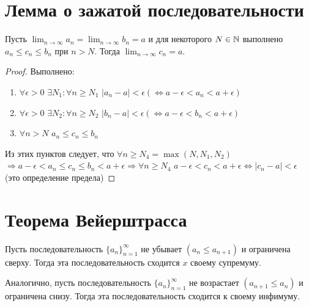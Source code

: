 	\section{Лемма о зажатой последовательности}
	
	\begin{lemma}
		Пусть $\lim_{n \to \infty} a_n = \lim_{n \to \infty} b_n = a$ и для некоторого $N \in \mathbb N$ выполнено $a_n \leqslant c_n \leqslant b_n$ при $n > N$. Тогда $\lim_{n \to \infty} c_n = a$.
	\end{lemma}
	
	\begin{proof}
		Выполнено:
		\begin{enumerate}
			\item $\forall \epsilon > 0$ $\exists N_1: \forall n \geqslant N_1$ $|a_n - a| < \epsilon (\Leftrightarrow a - \epsilon < a_n < a + \epsilon)$
			\item $\forall \epsilon > 0$ $\exists N_2: \forall n \geqslant N_2$ $|b_n - a| < \epsilon (\Leftrightarrow a - \epsilon < b_n < a + \epsilon)$
			\item $\forall n > N$ $a_n \leqslant c_n \leqslant b_n$
		\end{enumerate}
		Из этих пунктов следует, что $\forall n \geqslant N_4 = \max{(N, N_1, N_2)}$ $\Rightarrow a - \epsilon < a_n \leqslant c_n \leqslant b_n < a + \epsilon \Rightarrow \forall n \geqslant N_4$ $a - \epsilon < c_n < a + \epsilon \Leftrightarrow |c_n - a| < \epsilon$ (это определение предела)
	\end{proof}
	
	\section{Теорема Вейерштрасса}
	
	\begin{theorem}[Вейерштрасс]
		Пусть последовательность $\{a_n\}^{\infty}_{n = 1}$ не убывает $(a_n \leqslant a_{n + 1})$ и ограничена сверху. Тогда эта последовательность сходится $x$ своему супремуму.
		
		Аналогично, пусть последовательность $\{a_n\}^{\infty}_{n = 1}$ не возрастает $(a_{n + 1} \leqslant a_n)$ и ограничена снизу. Тогда эта последовательность сходится к своему инфимуму.
	\end{theorem}
	
